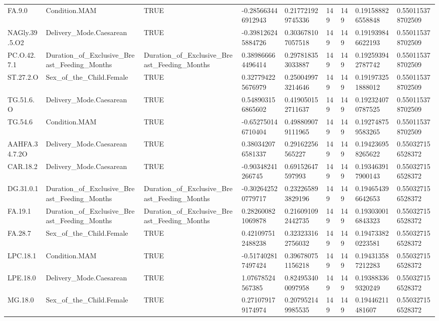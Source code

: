 \begin{longtable}{lllllllll}
FA.9.0 & Condition.MAM & TRUE & -0.285663446912943 & 0.217721929745336 & 149 & 149 & 0.191588826558848 & 0.550115378702509 \\
NAGly.39.5.O2 & Delivery\_Mode.Caesarean & TRUE & -0.398126245884726 & 0.303678107057518 & 149 & 149 & 0.191939846622193 & 0.550115378702509 \\
PC.O.42.7.1 & Duration\_of\_Exclusive\_Breast\_Feeding\_Months & Duration\_of\_Exclusive\_Breast\_Feeding\_Months & 0.389866664496414 & 0.297818353033887 & 149 & 149 & 0.192593942787742 & 0.550115378702509 \\
ST.27.2.O & Sex\_of\_the\_Child.Female & TRUE & 0.327794225676979 & 0.250049973214646 & 149 & 149 & 0.191973251888012 & 0.550115378702509 \\
TG.51.6.O & Delivery\_Mode.Caesarean & TRUE & 0.548903156865602 & 0.419050152711637 & 149 & 149 & 0.192324070787525 & 0.550115378702509 \\
TG.54.6 & Condition.MAM & TRUE & -0.652750146710404 & 0.498809079111965 & 149 & 149 & 0.192748759583265 & 0.550115378702509 \\
AAHFA.34.7.2O & Delivery\_Mode.Caesarean & TRUE & 0.380342076581337 & 0.29162256565227 & 149 & 149 & 0.194236958265622 & 0.550327156528372 \\
CAR.18.2 & Delivery\_Mode.Caesarean & TRUE & -0.90348241266745 & 0.69152647597993 & 149 & 149 & 0.193463917900143 & 0.550327156528372 \\
DG.31.0.1 & Duration\_of\_Exclusive\_Breast\_Feeding\_Months & Duration\_of\_Exclusive\_Breast\_Feeding\_Months & -0.302642520779717 & 0.232265893829196 & 149 & 149 & 0.194654396642653 & 0.550327156528372 \\
FA.19.1 & Duration\_of\_Exclusive\_Breast\_Feeding\_Months & Duration\_of\_Exclusive\_Breast\_Feeding\_Months & 0.282600821069878 & 0.216091092442735 & 149 & 149 & 0.193030016843323 & 0.550327156528372 \\
FA.28.7 & Sex\_of\_the\_Child.Female & TRUE & 0.421097512488238 & 0.323233162756032 & 149 & 149 & 0.194733820223581 & 0.550327156528372 \\
LPC.18.1 & Condition.MAM & TRUE & -0.517402817497424 & 0.396780751156218 & 149 & 149 & 0.194313587212283 & 0.550327156528372 \\
LPE.18.0 & Delivery\_Mode.Caesarean & TRUE & 1.07678524567385 & 0.824953400097958 & 149 & 149 & 0.193883369320249 & 0.550327156528372 \\
MG.18.0 & Sex\_of\_the\_Child.Female & TRUE & 0.271079179174974 & 0.207952149985535 & 149 & 149 & 0.19446211481607 & 0.550327156528372 \\

\end{longtable}

